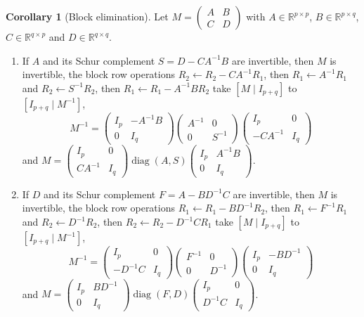 \documentclass[12pt]{article}
\newcommand{\R}{\mathbb R}
\DeclareMathOperator{\diag}{diag}
\theoremstyle{definition}
\newtheorem{corollary}[theorem]{Corollary}
\begin{document}
\begin{corollary}[Block elimination]\label{r5b-cor-schur-inverse}
Let \(M=\begin{pmatrix}A&B\\C&D\end{pmatrix}\) with \(A\in\R^{p\times p}\), \(B\in\R^{p\times q}\),
\(C\in\R^{q\times p}\) and \(D\in\R^{q\times q}\).
\begin{enumerate}
\item If \(A\) and its Schur complement \(S=D-CA^{-1}B\) are invertible, then \(M\) is invertible, the block
row operations \(R_2\leftarrow R_2-CA^{-1}R_1\), then \(R_1\leftarrow A^{-1}R_1\) and \(R_2\leftarrow S^{-1}R_2\),
then \(R_1\leftarrow R_1-A^{-1}BR_2\) take \([M\mid I_{p+q}]\) to \([I_{p+q}\mid M^{-1}]\),
\[
M^{-1}=\begin{pmatrix}I_p&-A^{-1}B\\0&I_q\end{pmatrix}\begin{pmatrix}A^{-1}&0\\0&S^{-1}\end{pmatrix}
\begin{pmatrix}I_p&0\\-CA^{-1}&I_q\end{pmatrix}
\]
and \(M=\left(\begin{smallmatrix}I_p&0\\CA^{-1}&I_q\end{smallmatrix}\right)\diag(A,S)
\left(\begin{smallmatrix}I_p&A^{-1}B\\0&I_q\end{smallmatrix}\right)\).
\item If \(D\) and its Schur complement \(F=A-BD^{-1}C\) are invertible, then \(M\) is invertible, the block
row operations \(R_1\leftarrow R_1-BD^{-1}R_2\), then \(R_1\leftarrow F^{-1}R_1\) and \(R_2\leftarrow D^{-1}R_2\),
then \(R_2\leftarrow R_2-D^{-1}CR_1\) take \([M\mid I_{p+q}]\) to \([I_{p+q}\mid M^{-1}]\),
\[
M^{-1}=\begin{pmatrix}I_p&0\\-D^{-1}C&I_q\end{pmatrix}\begin{pmatrix}F^{-1}&0\\0&D^{-1}\end{pmatrix}
\begin{pmatrix}I_p&-BD^{-1}\\0&I_q\end{pmatrix}
\]
and \(M=\left(\begin{smallmatrix}I_p&BD^{-1}\\0&I_q\end{smallmatrix}\right)\diag(F,D)
\left(\begin{smallmatrix}I_p&0\\D^{-1}C&I_q\end{smallmatrix}\right)\).
\end{enumerate}
\end{corollary}
\end{document}
